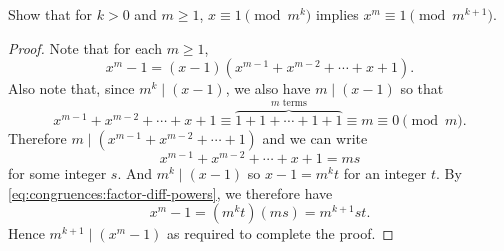  Show that for $k > 0$ and $m\geq1$, $x\equiv1\pmod{m^k}$
implies $x^m\equiv1\pmod{m^{k+1}}$.
\begin{proof}
  Note that for each $m\geq1$,
  \begin{equation}
    \label{eq:congruences:factor-diff-powers}
    x^m - 1 = (x - 1)(x^{m-1} + x^{m-2} + \cdots + x + 1).
  \end{equation}
  Also note that, since $m^k\mid(x-1)$, we also have $m\mid(x - 1)$ so
  that
  \begin{equation*}
    x^{m-1} + x^{m-2} + \cdots + x + 1
    \equiv \overbrace{1 + 1 + \cdots + 1 + 1}^{\text{$m$ terms}}
    \equiv m\equiv0\pmod{m}.
  \end{equation*}
  Therefore $m\mid(x^{m-1} + x^{m-2} + \cdots + 1)$ and we can write
  \begin{equation*}
    x^{m-1} + x^{m-2} + \cdots + x + 1 = ms
  \end{equation*}
  for some integer $s$. And $m^k\mid(x - 1)$ so $x - 1 = m^kt$ for an
  integer $t$. By \eqref{eq:congruences:factor-diff-powers}, we
  therefore have
  \begin{equation*}
    x^m - 1 = (m^kt)(ms) = m^{k+1}st.
  \end{equation*}
  Hence $m^{k+1}\mid(x^m - 1)$ as required to complete the proof.
\end{proof}
